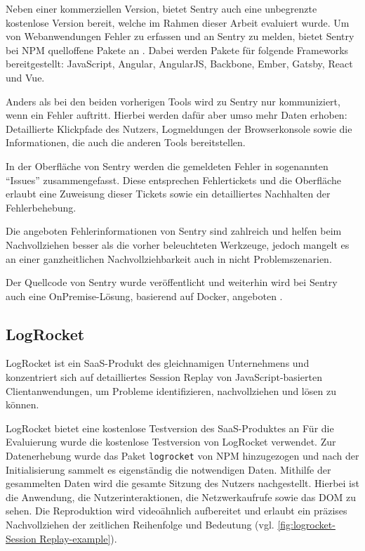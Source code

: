 Neben einer kommerziellen Version, bietet Sentry auch eine unbegrenzte kostenlose Version bereit, welche im Rahmen dieser Arbeit evaluiert wurde. Um von Webanwendungen Fehler zu erfassen und an Sentry zu melden, bietet Sentry bei NPM quelloffene Pakete an \cite{SentryJSGithub}. Dabei werden Pakete für folgende Frameworks bereitgestellt: JavaScript, Angular, AngularJS, Backbone, Ember, Gatsby, React und Vue.

Anders als bei den beiden vorherigen Tools wird zu Sentry nur kommuniziert, wenn ein Fehler auftritt. Hierbei werden dafür aber umso mehr Daten erhoben: Detaillierte Klickpfade des Nutzers, Logmeldungen der Browserkonsole sowie die Informationen, die auch die anderen Tools bereitstellen.

In der Oberfläche von Sentry werden die gemeldeten Fehler in sogenannten \enquote{Issues} zusammengefasst. Diese entsprechen Fehlertickets und die Oberfläche erlaubt eine Zuweisung dieser Tickets sowie ein detailliertes Nachhalten der Fehlerbehebung.

Die angeboten Fehlerinformationen von Sentry sind zahlreich und helfen beim Nachvollziehen besser als die vorher beleuchteten Werkzeuge, jedoch mangelt es an einer ganzheitlichen Nachvollziehbarkeit auch in nicht Problemszenarien.

Der Quellcode von Sentry wurde veröffentlicht und weiterhin wird bei Sentry auch eine OnPremise-Lösung, basierend auf Docker, angeboten \cite{SentrySelfHosted}.

\subsection{LogRocket}

LogRocket \cite{LogRocket} ist ein SaaS-Produkt des gleichnamigen Unternehmens und konzentriert sich auf detailliertes Session Replay von JavaScript-basierten Clientanwendungen, um Probleme identifizieren, nachvollziehen und lösen zu können.

LogRocket bietet eine kostenlose Testversion des SaaS-Produktes an
Für die Evaluierung wurde die kostenlose Testversion von LogRocket verwendet. Zur Datenerhebung wurde das Paket \texttt{logrocket} von NPM hinzugezogen und nach der Initialisierung sammelt es eigenständig die notwendigen Daten. Mithilfe der gesammelten Daten wird die gesamte Sitzung des Nutzers nachgestellt. Hierbei ist die Anwendung, die Nutzerinteraktionen, die Netzwerkaufrufe sowie das DOM zu sehen. Die Reproduktion wird videoähnlich aufbereitet und erlaubt ein präzises Nachvollziehen der zeitlichen Reihenfolge und Bedeutung (vgl. \autoref{fig:logrocket-Session Replay-example}).

